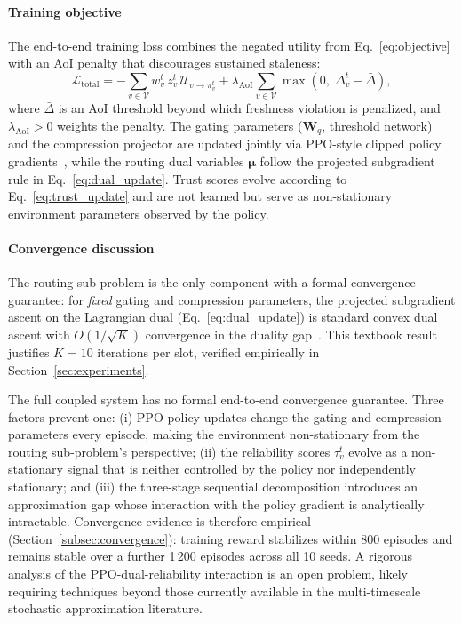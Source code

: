 \documentclass[final,3p,times,review,sort&compress]{elsarticle}
\begin{document}
\paragraph{Training objective}
The end-to-end training loss combines the negated utility from Eq.~\eqref{eq:objective} with an AoI penalty that discourages sustained staleness:
\begin{equation}
\mathcal{L}_{\mathrm{total}} = -\sum_{v\in\mathcal{V}}w_v^t\,z_v^t\,\mathcal{U}_{v\to\pi_v^t} + \lambda_{\mathrm{AoI}}\sum_{v\in\mathcal{V}}\max(0,\;\Delta_v^t - \bar{\Delta}),
\label{eq:loss}
\end{equation}
where $\bar{\Delta}$ is an AoI threshold beyond which freshness violation is penalized, and $\lambda_{\mathrm{AoI}} > 0$ weights the penalty. The gating parameters ($\mathbf{W}_q$, threshold network) and the compression projector are updated jointly via PPO-style clipped policy gradients~\cite{KANG2026111852}, while the routing dual variables $\boldsymbol{\mu}$ follow the projected subgradient rule in Eq.~\eqref{eq:dual_update}. Trust scores evolve according to Eq.~\ref{eq:trust_update} and are not learned but serve as non-stationary environment parameters observed by the policy.

\paragraph{Convergence discussion}
The routing sub-problem is the only component with a formal convergence guarantee: for \emph{fixed} gating and compression parameters, the projected subgradient ascent on the Lagrangian dual (Eq.~\eqref{eq:dual_update}) is standard convex dual ascent with $O(1/\sqrt{K})$ convergence in the duality gap~\cite{KANG2026111852}. This textbook result justifies $K{=}10$ iterations per slot, verified empirically in Section~\ref{sec:experiments}.

The full coupled system has no formal end-to-end convergence guarantee. Three factors prevent one: (i) PPO policy updates change the gating and compression parameters every episode, making the environment non-stationary from the routing sub-problem's perspective; (ii) the reliability scores $\tau_v^t$ evolve as a non-stationary signal that is neither controlled by the policy nor independently stationary; and (iii) the three-stage sequential decomposition introduces an approximation gap whose interaction with the policy gradient is analytically intractable. Convergence evidence is therefore empirical (Section~\ref{subsec:convergence}): training reward stabilizes within 800 episodes and remains stable over a further 1\,200 episodes across all 10 seeds. A rigorous analysis of the PPO-dual-reliability interaction is an open problem, likely requiring techniques beyond those currently available in the multi-timescale stochastic approximation literature.
\end{document}

